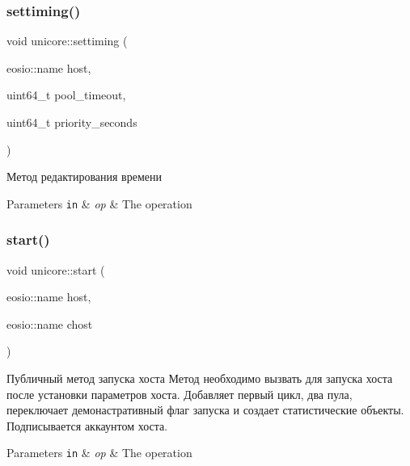 \subsubsection{\texorpdfstring{settiming()}{settiming()}}
{\footnotesize\ttfamily void unicore\+::settiming (\begin{DoxyParamCaption}\item[{eosio\+::name}]{host,  }\item[{uint64\+\_\+t}]{pool\+\_\+timeout,  }\item[{uint64\+\_\+t}]{priority\+\_\+seconds }\end{DoxyParamCaption})}



Метод редактирования времени 


\begin{DoxyParams}[1]{Parameters}
\mbox{\tt in}  & {\em op} & The operation \\
\hline
\end{DoxyParams}
\mbox{\label{classunicore_ad83b75f3c4afd1ab954d428be8f6f7d7}} 
\subsubsection{\texorpdfstring{start()}{start()}}
{\footnotesize\ttfamily void unicore\+::start (\begin{DoxyParamCaption}\item[{eosio\+::name}]{host,  }\item[{eosio\+::name}]{chost }\end{DoxyParamCaption})}



Публичный метод запуска хоста Метод необходимо вызвать для запуска хоста после установки параметров хоста. Добавляет первый цикл, два пула, переключает демонастративный флаг запуска и создает статистические объекты. Подписывается аккаунтом хоста. 


\begin{DoxyParams}[1]{Parameters}
\mbox{\tt in}  & {\em op} & The operation \\
\hline
\end{DoxyParams}
\mbox{\label{classunicore_adb0134644edf42ff41b84bca15e6e8ff}} 
